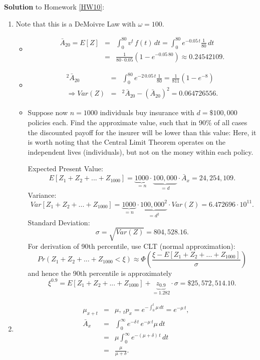 \documentclass[11pt,fleqn,oneside]{book}
\begin{document}
\noindent \textbf{Solution} to Homework \ref{HW10}:
\footnotesize
\begin{enumerate}
\item Note that this is a DeMoivre Law with $\omega = 100$.
\begin{itemize}
\item 
\begin{eqnarray*}
\bar{A}_{20} = E[Z] &=& \int_0^{80} v^t\,f(t)\,dt = \int_0^{80} e^{-0.05\,t} \frac{1}{80}\,dt\\
&=& \frac{1}{80\cdot 0.05} \left(1-e^{-0.05\,80}\right) \approx 0.24542109.
\end{eqnarray*}
\item 
\begin{eqnarray*}
{^2\bar{A}_{20}} &=& \int_0^{80} e^{-2\,0.05\,t}\frac{1}{80} = \frac{1}{811}\left(1-e^{-8}\right)\\
\Rightarrow Var(Z) &=& {^2\bar{A}_{20}} - \left( \bar{A}_{20}\right)^2 = 0.064726556.
\end{eqnarray*}
\item Suppose now $n=1000$ individuals buy insurance with $d=\$100,000$ policies each. Find the approximate value, such that in 90\% of all cases the discounted payoff for the insurer will be lower than this value:
Here, it is worth noting that the Central Limit Theorem operates on the independent lives (individuals), but not on the money within each policy.

Expected Present Value:
$$
E\left[Z_1 + Z_2 +...+ Z_{1000}\right] = \underbrace{1000}_{=n} \cdot \underbrace{100,000}_{=d} \cdot \bar{A}_x = 24,254,109.
$$
Variance:
$$
Var\left[Z_1 + Z_2 +...+ Z_{1000}\right] = \underbrace{1000}_{=n} \cdot \underbrace{100,000^2}_{=d^2} \cdot Var(Z) = 6.472696 \cdot 10^{11}.
$$
Standard Deviation:
$$
\sigma = \sqrt{Var(Z)}= 804,528.16.
$$
For derivation of 90th percentile, use CLT (normal approximation):
$$
Pr\left(Z_1 + Z_2+...+Z_{1000} < \xi \right) \approx \Phi\left(\frac{\xi - E\left[Z_1 + Z_2 +...+ Z_{1000}\right] }{\sigma }\right)
$$
and hence the 90th percentile is approximately
$$
\xi^{0.9} = E\left[Z_1 + Z_2 +...+ Z_{1000}\right] + \underbrace{z_{0.9}}_{=1.282} \cdot \sigma = 
\$ 25,572,514.10.
$$
\end{itemize}

\item
\begin{eqnarray*}
\mu_{x+t} &=& \mu,\,{_tp_x} = e^{-\int_0^t \mu\,dt} = e^{-\mu\,t},\\
{\bar{A}_x} &=& \int_0^{\infty} e^{-\delta\,t} \, e^{-\mu\,t} \mu\,dt \\
&=& \mu \int_0^{\infty} e^{-(\mu + \delta)\,t}\,dt \\
&=& \frac{\mu}{\mu + \delta}.
\end{eqnarray*}


\end{enumerate}
\end{document}
